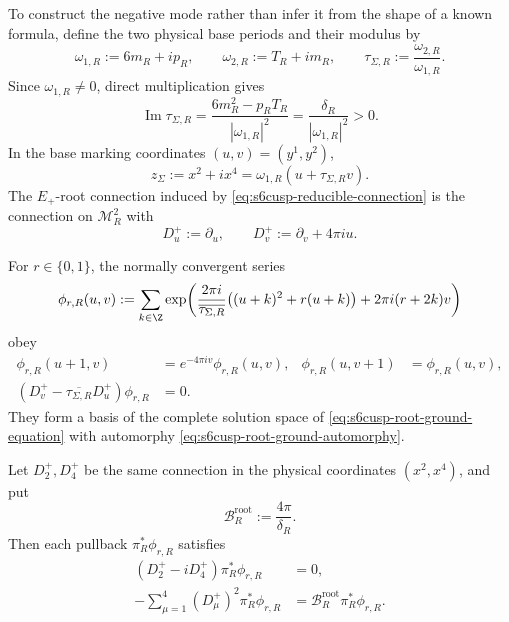 To construct the negative mode rather than infer it from the shape of a
known formula, define the two physical base periods and their modulus by
\begin{equation}\label{eq:s6cusp-Sigma-complex-periods}
 \omega_{1,R}:=6m_R+ip_R,
 \qquad
 \omega_{2,R}:=T_R+im_R,
 \qquad
 \tau_{\Sigma,R}:=\frac{\omega_{2,R}}{\omega_{1,R}}.
\end{equation}
Since \(\omega_{1,R}\ne0\), direct multiplication gives
\begin{equation}\label{eq:s6cusp-Sigma-modulus-positive}
 \operatorname{Im}\tau_{\Sigma,R}
 =\frac{6m_R^2-p_RT_R}{|\omega_{1,R}|^2}
 =\frac{\delta_R}{|\omega_{1,R}|^2}>0.
\end{equation}
In the base marking coordinates \((u,v)=(y^1,y^2)\),
\begin{equation}\label{eq:s6cusp-Sigma-complex-coordinate}
 z_{\Sigma}:=x^2+ix^4
 =\omega_{1,R}(u+\tau_{\Sigma,R}v).
\end{equation}
The \(E_+\)-root connection induced by
\eqref{eq:s6cusp-reducible-connection} is the connection on
\(\mathcal M_R^2\) with
\begin{equation}\label{eq:s6cusp-root-covariant-derivatives}
 D_u^+:=\partial_u,
 \qquad
 D_v^+:=\partial_v+4\pi i u.
\end{equation}

\begin{proposition}
\label{prop:s6cusp-explicit-root-ground-sections}
For \(r\in\{0,1\}\), the normally convergent series
\begin{equation}\label{eq:s6cusp-root-ground-theta-series}
 \phi_{r,R}(u,v):=
 \sum_{k\in\Z}
 \exp\!\left(
  \frac{2\pi i}{\overline{\tau_{\Sigma,R}}}
  \bigl((u+k)^2+r(u+k)\bigr)
  +2\pi i(r+2k)v
 \right)
\end{equation}
obey
\begin{align}
 \phi_{r,R}(u+1,v)&=e^{-4\pi i v}\phi_{r,R}(u,v),&
 \phi_{r,R}(u,v+1)&=\phi_{r,R}(u,v),
 \label{eq:s6cusp-root-ground-automorphy}\\
 (D_v^+-\overline{\tau_{\Sigma,R}}D_u^+)
 \phi_{r,R}&=0.
 \label{eq:s6cusp-root-ground-equation}
\end{align}
They form a basis of the complete solution space of
\eqref{eq:s6cusp-root-ground-equation} with automorphy
\eqref{eq:s6cusp-root-ground-automorphy}.

Let \(D_2^+,D_4^+\) be the same connection in the physical coordinates
\((x^2,x^4)\), and put
\begin{equation}\label{eq:s6cusp-root-magnetic-field}
 \mathcal B_R^{\mathrm{root}}:=\frac{4\pi}{\delta_R}.
\end{equation}
Then each pullback \(\pi_R^*\phi_{r,R}\) satisfies
\begin{align}
 (D_2^+-iD_4^+)\pi_R^*\phi_{r,R}&=0,
 \label{eq:s6cusp-root-physical-ground-equation}\\
 -\sum_{\mu=1}^4(D_\mu^+)^2\pi_R^*\phi_{r,R}
 &=\mathcal B_R^{\mathrm{root}}\pi_R^*\phi_{r,R}.
 \label{eq:s6cusp-root-scalar-ground-energy}
\end{align}
\end{proposition}

